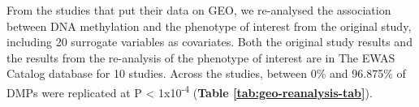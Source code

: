 \documentclass[11pt,oneside]{bristolthesis}
\begin{document}
From the studies that put their data on GEO, we re-analysed the association between DNA methylation and the phenotype of interest from the original study, including 20 surrogate variables as covariates. Both the original study results and the results from the re-analysis of the phenotype of interest are in The EWAS Catalog database for 10 studies. Across the studies, between 0\% and 96.875\% of DMPs were replicated at P \textless{} 1x10\textsuperscript{-4} (\textbf{Table \ref{tab:geo-reanalysis-tab}}). \linebreak
\begin{table}[!h]

\caption{\label{tab:geo-reanalysis-tab}GEO re-analysis replication}
\centering
{}
\end{table}
\linebreak
\end{document}
